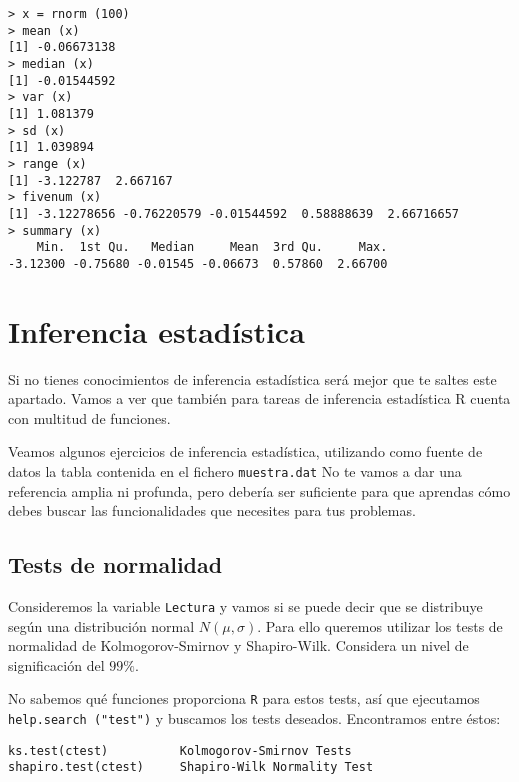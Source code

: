 \begin{verbatim}
> x = rnorm (100)
> mean (x)
[1] -0.06673138
> median (x)
[1] -0.01544592
> var (x)
[1] 1.081379
> sd (x)
[1] 1.039894
> range (x)
[1] -3.122787  2.667167
> fivenum (x)
[1] -3.12278656 -0.76220579 -0.01544592  0.58888639  2.66716657
> summary (x)
    Min.  1st Qu.   Median     Mean  3rd Qu.     Max. 
-3.12300 -0.75680 -0.01545 -0.06673  0.57860  2.66700
\end{verbatim}

\section{Inferencia estadística}


Si no tienes conocimientos de inferencia estadística será mejor que te
saltes  este  apartado.  Vamos  a  ver  que  también  para  tareas  de
inferencia estadística {\sf R} cuenta con multitud de funciones.

Veamos algunos  ejercicios de inferencia estadística,  utilizando como
fuente de datos la tabla contenida  en el fichero {\tt muestra.dat} No
te vamos  a dar una  referencia amplia  ni profunda, pero  debería ser
suficiente para que aprendas cómo debes buscar las funcionalidades que
necesites para tus problemas.

\subsection*{Tests de normalidad}



Consideremos la variable  {\tt Lectura} y vamos si se  puede decir que
se distribuye según una distribución normal $N(\mu,\sigma)$. Para ello
queremos  utilizar los  tests  de normalidad  de Kolmogorov-Smirnov  y
Shapiro-Wilk. Considera un nivel de significación del $99\%$.

No sabemos qué funciones proporciona {\tt R} para estos tests, así que
ejecutamos \verb|help.search ("test")| y  buscamos los tests deseados.
Encontramos entre éstos:

\begin{verbatim}
ks.test(ctest)          Kolmogorov-Smirnov Tests
shapiro.test(ctest)     Shapiro-Wilk Normality Test
\end{verbatim}


